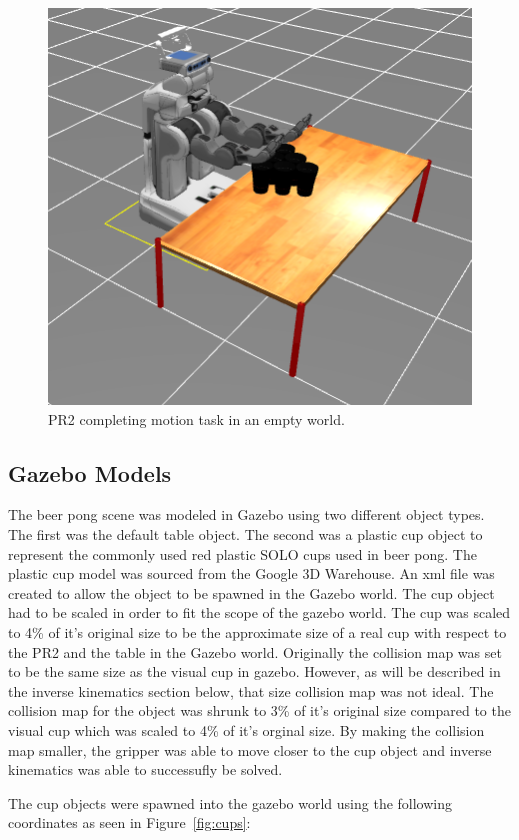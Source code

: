 \documentclass[letterpaper, 10 pt, conference]{ieeeconf}  %
\begin{document}
\begin{figure}[thpb]
      \centering
	  \includegraphics[scale =0.2]{cups_pr2_table}
      \caption{PR2 completing motion task in an empty world.}
      \label{fig:start}
\end{figure}


\subsection{Gazebo Models}
The beer pong scene was modeled in Gazebo using two different object types. The first was the default table object. The second was a plastic cup object to represent the commonly used red plastic SOLO cups used in beer pong. The plastic cup model was sourced from the Google 3D Warehouse. An xml file was created to allow the object to be spawned in the Gazebo world. The cup object had to be scaled in order to fit the scope of the gazebo world. The cup was scaled to 4\% of it's original size to be the approximate size of a real cup with respect to the PR2 and the table in the Gazebo world. Originally the collision map was set to be the same size as the visual cup in gazebo. However, as will be described in the inverse kinematics section below, that size collision map was not ideal. The collision map for the object was shrunk to 3\% of it's original size compared to the visual cup which was scaled to 4\% of it's orginal size. By making the collision map smaller, the gripper was able to move closer to the cup object and inverse kinematics was able to successufly be solved. 

The cup objects were spawned into the gazebo world using the following coordinates as seen in Figure~\ref{fig:cups}:
\end{document}
